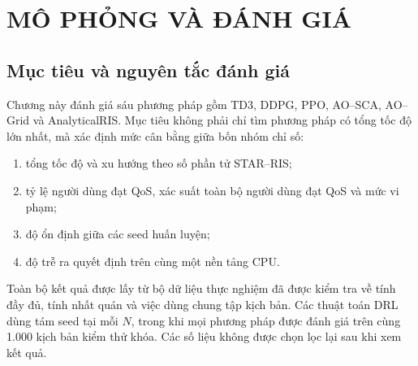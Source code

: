 \chapter{MÔ PHỎNG VÀ ĐÁNH GIÁ}
\label{chap:results}

\section{Mục tiêu và nguyên tắc đánh giá}
Chương này đánh giá sáu phương pháp gồm TD3, DDPG, PPO, AO--SCA, AO--Grid và AnalyticalRIS. Mục tiêu không phải chỉ tìm phương pháp có tổng tốc độ lớn nhất, mà xác định mức cân bằng giữa bốn nhóm chỉ số:
\begin{enumerate}[label=\arabic*)]
  \item tổng tốc độ và xu hướng theo số phần tử STAR--RIS;
  \item tỷ lệ người dùng đạt QoS, xác suất toàn bộ người dùng đạt QoS và mức vi phạm;
  \item độ ổn định giữa các seed huấn luyện;
  \item độ trễ ra quyết định trên cùng một nền tảng CPU.
\end{enumerate}

Toàn bộ kết quả được lấy từ bộ dữ liệu thực nghiệm đã được kiểm tra về tính đầy đủ, tính nhất quán và việc dùng chung tập kịch bản. Các thuật toán DRL dùng tám seed tại mỗi $N$, trong khi mọi phương pháp được đánh giá trên cùng 1.000 kịch bản kiểm thử khóa. Các số liệu không được chọn lọc lại sau khi xem kết quả.

